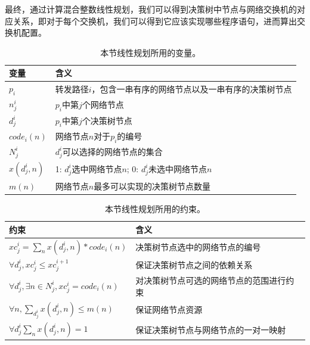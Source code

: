 最终，通过计算混合整数线性规划，我们可以得到决策树中节点与网络交换机的对应关系，即对于每个交换机，我们可以得到它应该实现哪些程序语句，进而算出交换机配置。

\begin{table}[]
\centering
\begin{tabular}{l|l}
\hline
变量     & 含义                                                             \\ \hline
$p_i$ & 转发路径$i$，包含一串有序的网络节点以及一串有序的决策树节点                            \\ 
$n_j^i$          &  $p_i$中第$j$个网络节点                      \\
$d_j^i$        & $p_i$中第$j$个决策树节点                                            \\
$code_i(n)$        &  网络节点$n$对于$p_i$的编号\\
$N_j^i$     &  $d_j^i$可以选择的网络节点的集合\\
$x(d_j^i, n)$      &  1: $d_j^i$选中网络节点$n$; 0: $d_j^i$未选中网络节点$n$\\
$m(n)$              & 网络节点$n$最多可以实现的决策树节点数量\\
\hline              
\end{tabular}
\caption{\small 本节线性规划所用的变量。}
\label{table:variables}
\end{table}

\begin{table}[]
\centering
\begin{tabular}{l|l}
\hline
约束                                        & 含义                               \\ \hline
$xc_j^i = \sum_n x(d_j^i, n)*code_i(n)$          & 决策树节点选中的网络节点的编号   \\
$\forall d_j^i, xc_j^i \leq xc_j^{i+1}$                    & 保证决策树节点之间的依赖关系                  \\
$\forall d_j^i, \exists n \in N_j^i, xc_j^i = code_i(n)$      & 对决策树节点可选的网络节点的范围进行约束     \\
$\forall n, \sum_{d_j^i} x(d_j^i, n) \leq m(n)$   & 保证网络节点资源 \\
$\forall d_j^i \sum_n x(d_j^i, n) = 1$  & 保证决策树节点与网络节点的一对一映射\\
\hline
\end{tabular}
\caption{\small 本节线性规划所用的约束。}
\label{table:constraints}
\end{table}



